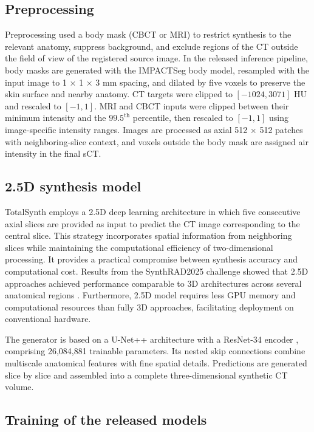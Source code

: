 \documentclass{article}
\begin{document}
\subsection{Preprocessing}

Preprocessing used a body mask (CBCT or MRI) to restrict synthesis to the relevant anatomy, suppress background, and exclude regions of the CT outside the field of view of the registered source image. In the released inference pipeline, body masks are generated with the IMPACTSeg body model, resampled with the input image to 1 $\times$ 1 $\times$ 3 mm spacing, and dilated by five voxels to preserve the skin surface and nearby anatomy. CT targets were clipped to $[-1024, 3071]$ HU and rescaled to $[-1, 1]$. MRI and CBCT inputs were clipped between their minimum intensity and the $99.5^{\mathrm{th}}$ percentile, then rescaled to $[-1, 1]$ using image-specific intensity ranges. Images are processed as axial 512 $\times$ 512 patches with neighboring-slice context, and voxels outside the body mask are assigned air intensity in the final sCT.

\subsection{2.5D synthesis model}

TotalSynth employs a 2.5D deep learning architecture in which five consecutive axial slices are provided as input to predict the CT image corresponding to the central slice. This strategy incorporates spatial information from neighboring slices while maintaining the computational efficiency of two-dimensional processing. It provides a practical compromise between synthesis accuracy and computational cost. Results from the SynthRAD2025 challenge showed that 2.5D approaches achieved performance comparable to 3D architectures across several anatomical regions \cite{rogowski2026generating}. Furthermore, 2.5D model requires less GPU memory and computational resources than fully 3D approaches, facilitating deployment on conventional hardware.

The generator is based on a U-Net++ architecture with a ResNet-34 encoder \cite{zhou1807nested,he2016deep}, comprising 26,084,881 trainable parameters. Its nested skip connections combine multiscale anatomical features with fine spatial details. Predictions are generated slice by slice and assembled into a complete three-dimensional synthetic CT volume.

\subsection{Training of the released models}
\end{document}
